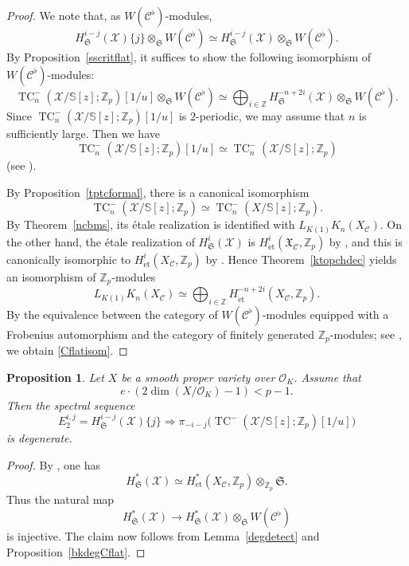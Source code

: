 \documentclass[11pt]{amsart}
\newtheorem{prop}[lemma]{Proposition}
\numberwithin{equation}{section}
\newcommand{\Z}{\mathbb{Z}}
\newcommand{\sC}{\mathcal{C}}
\newcommand{\sO}{\mathcal{O}}
\newcommand{\sX}{\mathcal{X}}
\newcommand{\mf}{\mathfrak}
\newcommand{\et}{{\operatorname{\acute{e}t}}}
\newcommand{\mS}{\mf{S}}
\numberwithin{equation}{section}
\newcommand{\TCn}{\operatorname{TC}^{-}}
\newcommand{\bS}{\mathbb{S}}
\newcommand{\LK}{{L_{K(1)}}}
\begin{document}
\begin{proof}
We note that, as $W(\sC^\flat)$-modules,
\[
  H_{\mS}^{i-j}(\sX)\{j\}\otimes_{\mS}W(\sC^\flat)
  \simeq
  H_{\mS}^{i-j}(\sX)\otimes_{\mS}W(\sC^\flat).
\]
By Proposition~\ref{sscritflat}, it suffices to show the following isomorphism of $W(\sC^\flat)$-modules:
\begin{equation}\label{Cflatisom}
  \TCn_n(\sX/\bS[z];\Z_p)[1/u]\otimes_{\mS}W(\sC^\flat)
  \simeq
  \bigoplus_{i\in \Z} H_{\mS}^{-n+2i}(\sX)\otimes_{\mS}W(\sC^\flat).
\end{equation}
Since $\TCn_n(\sX/\bS[z];\Z_p)[1/u]$ is $2$-periodic, we may assume that $n$ is sufficiently large. Then we have
\[
  \TCn_n(\sX/\bS[z];\Z_p)[1/u] \simeq \TCn_n(\sX/\bS[z];\Z_p)
  \]
(see \cite[Proposition 2.6]{M26}).

By Proposition~\ref{tptcformal}, there is a canonical isomorphism
\[
  \TCn_n(\sX/\bS[z];\Z_p)\simeq \TCn_n(X/\bS[z];\Z_p).
\]
By Theorem~\ref{ncbms}, its \'etale realization is identified with $\LK K_n(X_\sC)$. On the other hand, the \'etale realization of $H^i_{\mS}(\sX)$ is $H^i_{\et}(\mf{X}_\sC,\Z_p)$ by \cite[Theorem 1.2]{BMS19}, and this is canonically isomorphic to $H^i_{\et}(X_\sC,\Z_p)$ by \cite{F95}. Hence Theorem~\ref{ktopchdec} yields an isomorphism of $\Z_p$-modules
\[
  \LK K_n(X_\sC)\simeq \bigoplus_{i\in \Z} H_{\et}^{-n+2i}(X_\sC,\Z_p).
\]
By the equivalence between the category of $W(\sC^\flat)$-modules equipped with a Frobenius automorphism and the category of finitely generated $\Z_p$-modules; see \cite[Theorem 3.2.5]{BC09}, we obtain \eqref{Cflatisom}.
\end{proof}

\begin{prop}\label{bkdeg}
Let $X$ be a smooth proper variety over $\sO_K$. Assume that
\[
  e\cdot (2\dim(X/\sO_K)-1)< p-1.
\]
Then the spectral sequence
\[
  E_2^{i,j}=H_{\mS}^{i-j}(\sX)\{j\} \Longrightarrow \pi_{-i-j}\bigl(\TCn(\sX/\bS[z];\Z_p)[1/u]\bigr)
\]
is degenerate.
\end{prop}

\begin{proof}
By \cite[Theorem 5.11]{M21}, one has
\[
  H_{\mS}^{*}(\sX)\simeq H_{\et}^{*}(X_\sC,\Z_p)\otimes_{\Z_p}\mS.
\]
Thus the natural map
\[
  H_{\mS}^{*}(\sX)\to H_{\mS}^{*}(\sX)\otimes_{\mS}W(\sC^\flat)
\]
is injective. The claim now follows from Lemma~\ref{degdetect} and Proposition~\ref{bkdegCflat}.
\end{proof}
  

\end{document}
